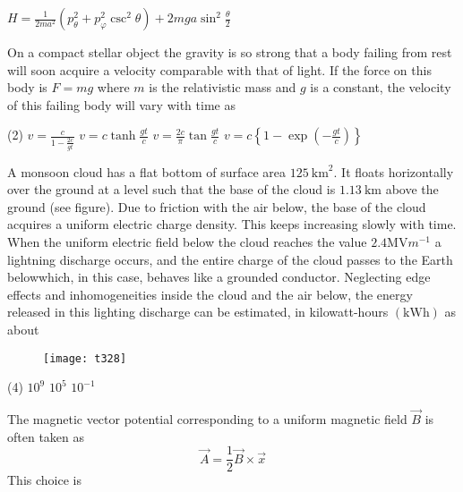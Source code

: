\begin{questions}
\begin{tasks}
	\task[\textbf{D.}] $H=\frac{1}{2 m a^{2}}\left(p_{\theta}^{2}+p_{\varphi}^{2} \csc ^{2} \theta\right)+2 m g a \sin ^{2} \frac{\theta}{2}$
\end{tasks}
\begin{minipage}{\textwidth}
	\question On a compact stellar object the gravity is so strong that a body failing from rest will soon acquire a velocity comparable with that of light. If the force on this body is $F=m g$ where $m$ is the relativistic mass and $g$ is a constant, the velocity of this failing body will vary with time as
\end{minipage}
\begin{tasks}(2)
	\task[\textbf{A.}] $v=\frac{c}{1-\frac{2 c}{g t}}$
	\task[\textbf{B.}]   $v=c \tanh \frac{g t}{c}$
	\task[\textbf{C.}] $v=\frac{2 c}{\pi} \tan \frac{g t}{c}$
	\task[\textbf{D.}] $v=c\left\{1-\exp \left(-\frac{g t}{c}\right)\right\}$
\end{tasks}
\begin{minipage}{\textwidth}
	\question A monsoon cloud has a flat bottom of surface area $125 \mathrm{~km}^{2}$. It floats horizontally over the ground at a level such that the base of the cloud is $1.13 \mathrm{~km}$ above the ground (see figure). Due to friction with the air below, the base of the cloud acquires a uniform electric charge density. This keeps increasing slowly with time.
	When the uniform electric field below the cloud reaches the value $2.4 \mathrm{MV} m^{-1}$ a lightning discharge occurs, and the entire charge of the cloud passes to the Earth belowwhich, in this case, behaves like a grounded conductor. Neglecting edge effects and inhomogeneities inside the cloud and the air below, the energy released in this lighting discharge can be estimated, in kilowatt-hours $(\mathrm{kWh})$ as about
\end{minipage}
\begin{figure}[H]
	\centering
	\texttt{[image: t328]}
\end{figure}
\begin{tasks}(4)
	\task[\textbf{A.}] $10^{9}$
	\task[\textbf{B.}] $10^{5}$
	\task[\textbf{D.}] $10^{-1}$
\end{tasks}
\begin{minipage}{\textwidth}
	\question The magnetic vector potential corresponding to a uniform magnetic field $\vec{B}$ is often taken as
	$$
	\vec{A}=\frac{1}{2} \vec{B} \times \vec{x}
	$$
	This choice is
\end{minipage}

\end{questions}

